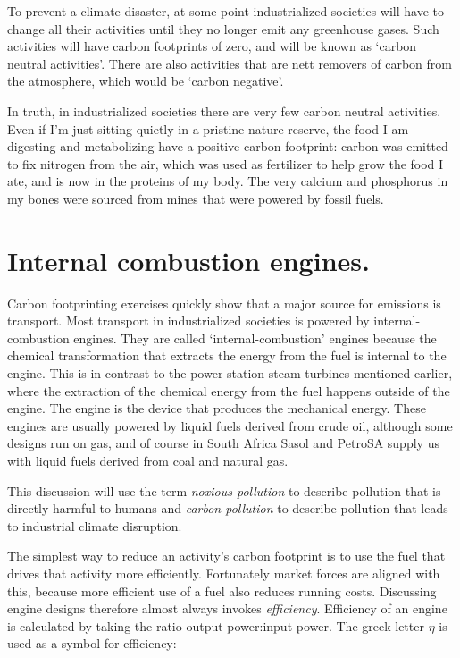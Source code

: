 To prevent a climate disaster, at some point industrialized societies will have
to change all their activities until they no longer emit any greenhouse gases.
Such activities will have carbon footprints of zero, and will be known as
`carbon neutral activities'. There are also activities that are nett removers of
carbon from the atmosphere, which would be `carbon negative'.

In truth, in industrialized societies there are very few carbon neutral
activities. Even if I'm just sitting quietly in a pristine nature reserve, the
food I am digesting and metabolizing have a positive carbon footprint: carbon
was emitted to fix nitrogen from the air, which was used as fertilizer to help
grow the food I ate, and is now in the proteins of my body. The very calcium and
phosphorus in my bones were sourced from mines that were powered by fossil
fuels. 

\section{Internal combustion engines.}

Carbon footprinting exercises quickly show that a major source for emissions is
transport. Most transport in industrialized societies is powered by
internal\hyp{}combustion engines. They are called `internal\hyp{}combustion' engines
because the chemical transformation that extracts the energy from the fuel is
internal to the engine. This is in contrast to the power station steam turbines
mentioned earlier, where the extraction of the chemical energy from the fuel
happens outside of the engine. The engine is the device that produces the
mechanical energy. These engines are usually powered by liquid fuels derived
from crude oil, although some designs run on gas, and of course in South Africa
Sasol and PetroSA supply us with liquid fuels derived from coal and natural gas.

This discussion will use the term \textit{noxious pollution} to describe
pollution that is directly harmful to humans and \textit{carbon pollution} to
describe pollution that leads to industrial climate disruption.

The simplest way to reduce an activity's carbon footprint is to use the fuel
that drives that activity more efficiently. Fortunately market forces are
aligned with this, because more efficient use of a fuel also reduces running
costs. Discussing engine designs therefore almost always invokes
\textit{efficiency}. Efficiency of an engine is calculated by taking the ratio
output power:input power. The greek letter $\eta$ is used as a symbol for
efficiency:

